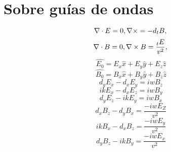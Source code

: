 \chapter{Sobre guías de ondas}

\begin{equation} 
\nabla \cdot E = 0,  \\ 
\nabla \times = - d_{t} B, \\
\end{equation}
\begin{equation}
\nabla \cdot B = 0, \\
\nabla \times B=  \frac{_{t} E}{v^2},  \\
\end{equation}
\begin{equation}
\hat{E_{0}} = E_{x}\hat{x} + E_{y}\hat{y}+E_{z}\hat{z}
\end{equation}
\begin{equation}
\hat{B_{0}} = B_{x}\hat{x} + B_{y}\hat{y}+B_{z}\hat{z}
\end{equation}
\begin{equation}
d_{y}E_{x}-d_{x}E_{y}= i w B_{z}
\end{equation}
\begin{equation}
i k E_{x}-d_{x}E_{z}= i w B_{y}
\end{equation}
\begin{equation}
d_{y}E_{z}-i k E_{y}= i w B_{x}
\end{equation}
\begin{equation}
d_{x}B_{z}-d_{y}B_{x}= \frac{-iw E_{Z} }{v^2} 
\end{equation}
\begin{equation}
i k B_{x}-d_{x}B_{z}= \frac{-iw E_{y} }{v^2} 
\end{equation}
\begin{equation}
d_{y}B_{z}- i k B_{y}= \frac{-iw E_{x} }{v^2} 
\end{equation}
